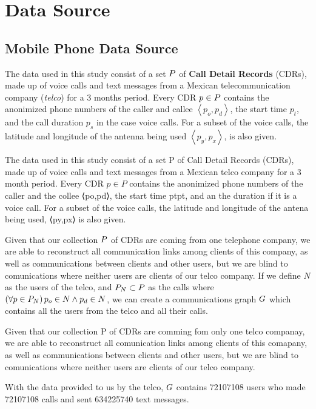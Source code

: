 \section{Data Source}

\subsection{Mobile Phone Data Source}

The data used in this study consist of a set \( \mathlarger{P} \) of \textbf{Call Detail Records} (CDRs), made up of voice calls and text messages from a Mexican telecommunication company (\textit{telco}) for a 3 months period.
Every CDR \( p \in \mathlarger{P} \)  contains the anonimized phone numbers of the caller and callee \( \left< p_o, p_d \right> \), the start time \( p_t \), and the call duration \( p_s \) in the case voice calls. 
For a subset of the voice calls, the latitude and longitude of the antenna being used \( \left< p_y, p_x \right> \), is also given.

The data used in this study consist of a set P of Call Detail Records (CDRs), made up of voice calls and text messages from a Mexican telco company for a 3 month period. Every CDR $ p \in P $ contains the anonimized phone numbers of the caller and the collee ⟨po,pd⟩, the start time ptpt, and an the duration if it is a voice call. For a subset of the voice calls, the latitude and longitude of the antena being used, ⟨py,px⟩ is also given.


Given that our collection \( \mathlarger{P} \) of CDRs are
coming from one telephone company, 
we are able to reconstruct all communication links among clients of this company, as well as communications between clients and other users, but we are blind to comunications where neither users are clients of our telco company.
If we define \( N \) as the users of the telco, and \( \mathlarger{P}_N \subset \mathlarger{P} \) as the calls where \( \left( \forall p \in \mathlarger{P}_N \right) p_o \in N \wedge p_d \in N \), we can create a communications graph \( \mathlarger{G} \) which contains all the users from the telco and all their calls.

Given that our collection P of CDRs are comming fom only one telco companay, we are able to reconstruct all comunication links among clients of this comapany, as well as communications between clients and other users, but we are blind to comunications where neither users are clients of our telco company.

With the data provided to us by the telco, \( \mathlarger{G} \) contains \num{72107108} users who made \num{72107108} calls and sent \num{634225740} text messages.

